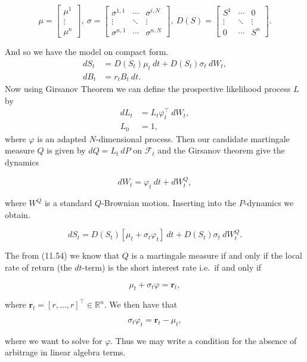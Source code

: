\documentclass[a4paper,10pt,openany]{book}
\begin{document}
\[
\mu =
\begin{bmatrix}
\mu ^1\\
\vdots\\
\mu ^n
\end{bmatrix},\ \sigma=
\begin{bmatrix}
\sigma^{1,1}& \cdots & \sigma^{i,N}\\
\vdots & \ddots & \vdots\\
\sigma^{n,1}&\cdots&\sigma^{n,N}
\end{bmatrix},\ D(S)=
\begin{bmatrix}
S^{1}& \cdots & 0\\
\vdots & \ddots & \vdots\\
0&\cdots&S^n
\end{bmatrix}.
\]

And so we have the model on compact form.
\begin{align*}
dS_t&= D(S_t)\mu_t\ dt+D(S_t)\sigma_t\ dW_t,\tag{14.3}\\
dB_t&=r_tB_t\ dt.\tag{14.4}
\end{align*}
Now using Girsanov Theorem we can define the prospective likelihood process \(L\) by
\begin{align*}
dL_t&=L_t\varphi_t^\top\ dW_t,\tag{14.5}\\
L_0&=1,\tag{14.6}
\end{align*}
where \(\varphi\) is an adapted \(N\)-dimensional process. Then our candidate martingale measure \(Q\) is given by \(dQ=L_t\ dP\) on \(\mathcal{F}_t\) and the Girsanov theorem give the dynamics

\[
dW_t=\varphi_t\ dt+dW_t^Q,\tag{14.7}
\]

where \(W^Q\) is a standard \(Q\)-Brownian motion. Inserting into the \(P\)-dynamics we obtain.

\[
dS_t=D(S_t)[\mu_t+\sigma_t\varphi_t]\ dt+D(S_t)\sigma_t\ dW_t^Q.\tag{14.8}
\]

The from (11.54) we know that \(Q\) is a martingale measure if and only if the local rate of return (the \(dt\)-term) is the short interest rate i.e.~if and only if

\[
\mu_t+\sigma_t\varphi=\mathbf{r}_t,\tag{14.9}
\]

where \(\mathbf{r}_t=[r,...,r]^\top\in\mathbb{R}^n\). We then have that

\[
\sigma_t\varphi_t = \mathbf{r}_t-\mu_t,\tag{14.11}
\]

where we want to solve for \(\varphi\). Thus we may write a condition for the absence of arbitrage in linear algebra terms.
\end{document}
